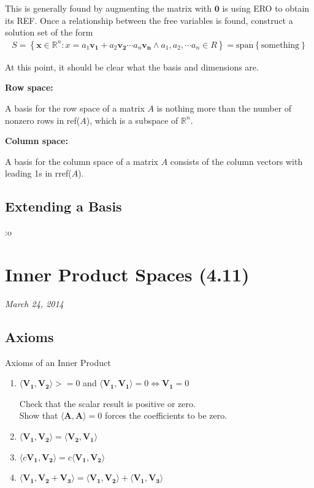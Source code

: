 \documentclass[a4paper,10pt]{report}
\newcommand{\ip}[2]{\langle#1,#2\rangle}	%
\newcommand{\vb}[1]{\mathbf{#1}}		%
\begin{document}
This is generally found by augmenting the matrix with $\mathbf{0}$ is using ERO to obtain its REF. Once a relationship between the free variables is found, construct a solution set of the form
\begin{align*}
S = \left\{ \mathbf{x}\in \mathbb{R}^n : x = a_1\mathbf{v_1} + a_2\mathbf{v_2} \cdots a_n\mathbf{v_n} \land a_1,a_2,\cdots a_n \in R \right\} = \text{span}\left\{ \text{something}\right\}
\end{align*}

At this point, it should be clear what the basis and dimensions are.

\textbf{Row space:}

A basis for the row space of a matrix $A$ is nothing more than the number of nonzero rows in ref($A$), which is a subspace of $\mathbb{R}^n$.

\textbf{Column space:}

A basis for the column space of a matrix $A$ consists of the column vectors with leading 1s in rref($A$).



\subsection{Extending a Basis}
:o

\section{Inner Product Spaces (4.11)}
\textit{March 24, 2014}\\

  \subsection{Axioms}
     Axioms of an Inner Product
    \begin{enumerate}
      \item
	$\ip{\vb{V_1}}{\vb{V_2}} >= 0$ and $\ip{\vb{V_1}}{\vb{V_1}}=0\iff\vb{V_1} = 0$

	Check that the scalar result is positive or zero.\\
	Show that $\ip{\vb{A}}{\vb{A}} = 0$ forces the coefficients to be zero.
      \item
	$\ip{\vb{V_1}}{\vb{V_2}} = \ip{\vb{V_2}}{\vb{V_1}}$
      \item
	$\ip{c\vb{V_1}}{\vb{V_2}} = c\ip{\vb{V_1}}{\vb{V_2}}$
      \item
	$\ip{\vb{V_1}}{\vb{V_2} + \vb{V_3}} = \ip{\vb{V_1}}{\vb{V_2}} + \ip{\vb{V_1}}{\vb{V_3}}$
    \end{enumerate}
\end{document}
